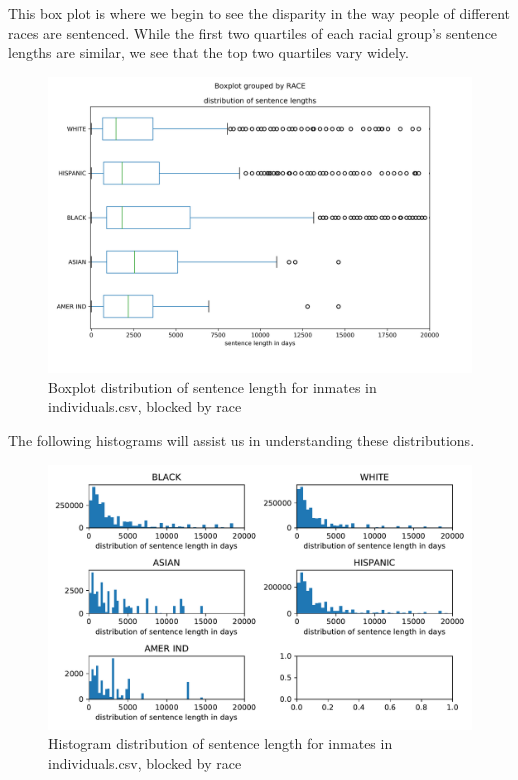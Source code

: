 \documentclass[11pt]{article}
\begin{document}
    This box plot is where we begin to see the disparity in the way people
of different races are sentenced. While the first two quartiles of each
racial group's sentence lengths are similar, we see that the top two
quartiles vary widely.

\begin{figure}[H]
    \centering
    \includegraphics[scale=.6]{images/sentence_boxplot.png}
    \caption{Boxplot distribution of sentence length for inmates in individuals.csv, blocked by race}
    \label{fig:my_label}
\end{figure}
    
    The following histograms will assist us in understanding these
distributions.

\begin{figure}[H]
    \centering
    \includegraphics[width=\textwidth]{images/race_sentence_dist.pdf}
    \caption{Histogram distribution of sentence length for inmates in individuals.csv, blocked by race}
    \label{fig:my_label}
\end{figure}
    
\end{document}
